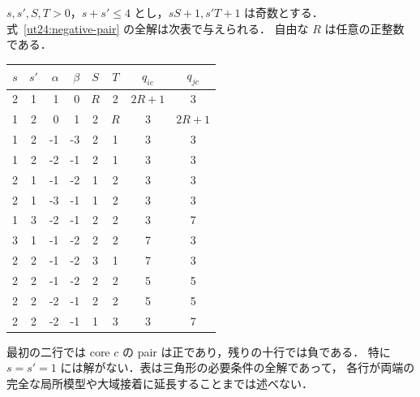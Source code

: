 \begin{lemma}[共通負位置の全解]
\label{ut24:negative-classification}
$s,s',S,T>0$，$s+s'\le4$ とし，$sS+1,s'T+1$ は奇数とする．
式~\eqref{ut24:negative-pair} の全解は次表で与えられる．
自由な $R$ は任意の正整数である．
\begin{center}\small
\begin{tabular}{cc|rr|cc|cc}
 $s$&$s'$&$\alpha$&$\beta$&$S$&$T$&$q_{ic}$&$q_{jc}$\\\hline
 2&1&1&0&$R$&2&$2R+1$&3\\
 1&2&0&1&2&$R$&3&$2R+1$\\\hline
 1&2&-1&-3&2&1&3&3\\
 1&2&-2&-1&2&1&3&3\\
 2&1&-1&-2&1&2&3&3\\
 2&1&-3&-1&1&2&3&3\\
 1&3&-2&-1&2&2&3&7\\
 3&1&-1&-2&2&2&7&3\\
 2&2&-1&-2&3&1&7&3\\
 2&2&-1&-2&2&2&5&5\\
 2&2&-2&-1&2&2&5&5\\
 2&2&-2&-1&1&3&3&7
\end{tabular}
\end{center}
最初の二行では core $c$ の pair は正であり，残りの十行では負である．
特に $s=s'=1$ には解がない．表は三角形の必要条件の全解であって，
各行が両端の完全な局所模型や大域接着に延長することまでは述べない．
\end{lemma}

